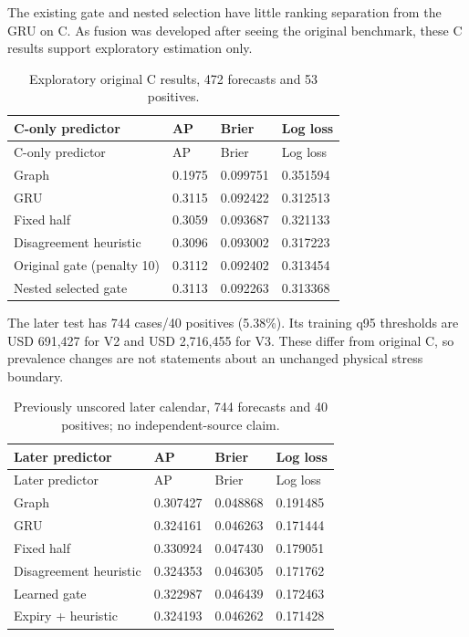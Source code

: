 \documentclass[
  10pt,
  a4paper,
]{article}
\begin{document}
The existing gate and nested selection have little ranking separation
from the GRU on C. As fusion was developed after seeing the original
benchmark, these C results support exploratory estimation only.

\begin{longtable}[]{@{}llll@{}}
\caption{Exploratory original C results, 472 forecasts and 53
positives.}\tabularnewline
\toprule\noalign{}
C-only predictor & AP & Brier & Log loss \\
\midrule\noalign{}
\endfirsthead
\toprule\noalign{}
C-only predictor & AP & Brier & Log loss \\
\midrule\noalign{}
\endhead
\bottomrule\noalign{}
\endlastfoot
Graph & 0.1975 & 0.099751 & 0.351594 \\
GRU & 0.3115 & 0.092422 & 0.312513 \\
Fixed half & 0.3059 & 0.093687 & 0.321133 \\
Disagreement heuristic & 0.3096 & 0.093002 & 0.317223 \\
Original gate (penalty 10) & 0.3112 & 0.092402 & 0.313454 \\
Nested selected gate & 0.3113 & 0.092263 & 0.313368 \\
\end{longtable}

The later test has 744 cases/40 positives (5.38\%). Its training q95
thresholds are USD 691,427 for V2 and USD 2,716,455 for V3. These differ
from original C, so prevalence changes are not statements about an
unchanged physical stress boundary.

\begin{longtable}[]{@{}llll@{}}
\caption{Previously unscored later calendar, 744 forecasts and 40
positives; no independent-source claim.}\tabularnewline
\toprule\noalign{}
Later predictor & AP & Brier & Log loss \\
\midrule\noalign{}
\endfirsthead
\toprule\noalign{}
Later predictor & AP & Brier & Log loss \\
\midrule\noalign{}
\endhead
\bottomrule\noalign{}
\endlastfoot
Graph & 0.307427 & 0.048868 & 0.191485 \\
GRU & 0.324161 & 0.046263 & 0.171444 \\
Fixed half & 0.330924 & 0.047430 & 0.179051 \\
Disagreement heuristic & 0.324353 & 0.046305 & 0.171762 \\
Learned gate & 0.322987 & 0.046439 & 0.172463 \\
Expiry + heuristic & 0.324193 & 0.046262 & 0.171428 \\
\end{longtable}
\end{document}
